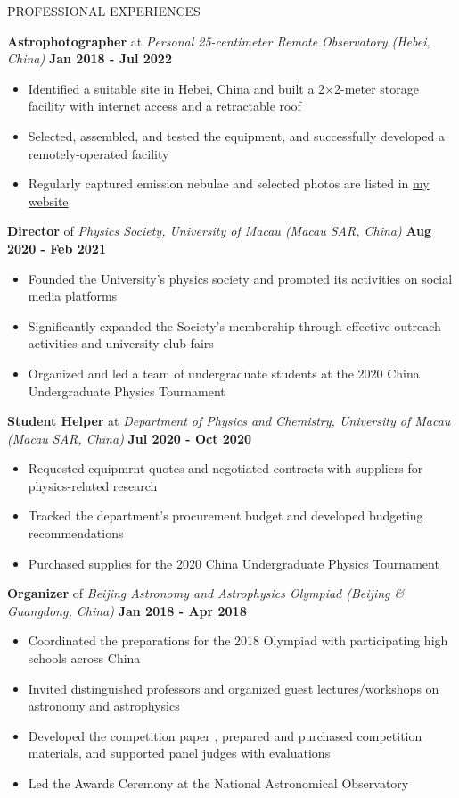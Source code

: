 \documentclass[10pt]{article} %
\begin{document}
\begin{section}{PROFESSIONAL EXPERIENCES}

\textbf{Astrophotographer} at \textit{Personal 25-centimeter Remote Observatory (Hebei, China)} \hfill \textbf{Jan 2018 - Jul 2022} 
\begin{itemize}[leftmargin=1.5em]
    \item Identified a suitable site in Hebei, China and built a 2$\times$2-meter storage facility with internet access and a retractable roof
    \item Selected, assembled, and tested the equipment, and successfully developed a remotely-operated facility
    \item Regularly captured emission nebulae and selected photos are listed in \href{https://cheysen.fit/astrophotography/}{my website}
\end{itemize}

\textbf{Director} of \textit{Physics Society, University of Macau (Macau SAR, China)} \hfill \textbf{Aug 2020 - Feb 2021} 
\begin{itemize}[leftmargin=1.5em]
    \item Founded the University's physics society and promoted its activities on social media platforms
    \item Significantly expanded the Society's membership through effective outreach activities and university club fairs
    \item Organized and led a team of undergraduate students at the 2020 China Undergraduate Physics Tournament
\end{itemize}

\textbf{Student Helper} at \textit{Department of Physics and Chemistry, University of Macau (Macau SAR, China)} \hfill \textbf{Jul 2020 - Oct 2020} 
\begin{itemize}[leftmargin=1.5em]
    \item Requested equipmrnt quotes and negotiated contracts with suppliers for physics-related research 
    \item Tracked the department's procurement budget and developed budgeting recommendations
    \item Purchased supplies for the 2020 China Undergraduate Physics Tournament
\end{itemize}

\textbf{Organizer} of \textit{Beijing Astronomy and Astrophysics Olympiad (Beijing \& Guangdong, China)} \hfill \textbf{Jan 2018 - Apr 2018} 
\begin{itemize}[leftmargin=1.5em]
    \item Coordinated the preparations for the 2018 Olympiad with participating high schools across China
    \item Invited distinguished professors and organized guest lectures/workshops on astronomy and
    astrophysics
    \item Developed the competition paper , prepared and purchased competition materials, and supported panel judges with evaluations
    \item Led the Awards Ceremony at the National Astronomical Observatory
\end{itemize}


\end{section}
\end{document}
